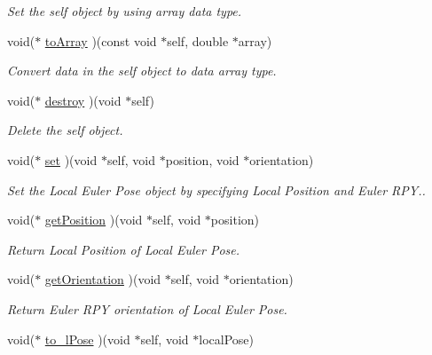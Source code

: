 \begin{CompactItemize}
\begin{CompactList}\small\item\em Set the self object by using array data type. \item\end{CompactList}\item 
void($\ast$ \hyperlink{structdrdc__lePose__t_5b46f3177e98426490325c7ec638b99e}{toArray} )(const void $\ast$self, double $\ast$array)
\begin{CompactList}\small\item\em Convert data in the self object to data array type. \item\end{CompactList}\item 
void($\ast$ \hyperlink{structdrdc__lePose__t_da06ad9ab4dcca6302286ba11be53b32}{destroy} )(void $\ast$self)
\begin{CompactList}\small\item\em Delete the self object. \item\end{CompactList}\item 
void($\ast$ \hyperlink{structdrdc__lePose__t_765510af2cd3050d12c281b6cac0af93}{set} )(void $\ast$self, void $\ast$position, void $\ast$orientation)
\begin{CompactList}\small\item\em Set the Local Euler Pose object by specifying Local Position and Euler RPY.. \item\end{CompactList}\item 
void($\ast$ \hyperlink{structdrdc__lePose__t_975326e7d6c204a3a7f9085ba14a971a}{getPosition} )(void $\ast$self, void $\ast$position)
\begin{CompactList}\small\item\em Return Local Position of Local Euler Pose. \item\end{CompactList}\item 
void($\ast$ \hyperlink{structdrdc__lePose__t_bdb8fe5909d51047d6e1388542ff4860}{getOrientation} )(void $\ast$self, void $\ast$orientation)
\begin{CompactList}\small\item\em Return Euler RPY orientation of Local Euler Pose. \item\end{CompactList}\item 
void($\ast$ \hyperlink{structdrdc__lePose__t_f7480671009e647ae378282c177f5f6f}{to\_\-lPose} )(void $\ast$self, void $\ast$localPose)

\end{CompactItemize}
